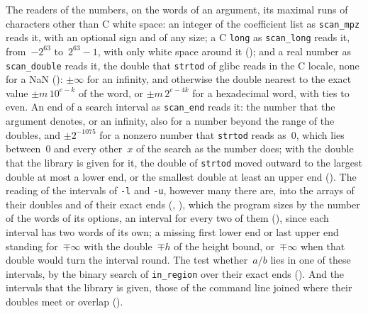 \begin{definition}\label{def:cliNumbers}
  \leanok
  The readers of the numbers, on the words of an argument, its maximal runs of characters other
  than C white space: an integer of the coefficient list as \verb|scan_mpz| reads it, with an
  optional sign and of any size; a C \verb|long| as \verb|scan_long| reads it, from~$-2^{63}$
  to~$2^{63} - 1$, with only white space around it (); and a real number
  as \verb|scan_double| reads it, the double that \verb|strtod| of glibc reads in the C locale, none
  for a NaN (): $\pm\infty$ for an infinity, and otherwise the double
  nearest to the exact value $\pm m\,10^{e - k}$ of the word, or $\pm m\,2^{e - 4k}$ for a
  hexadecimal word, with ties to even. An end of a search interval as \verb|scan_end| reads it: the
  number that the argument denotes, or an infinity, also for a number beyond the range of the
  doubles, and $\pm 2^{-1075}$ for a nonzero number that \verb|strtod| reads as~$0$, which lies
  between~$0$ and every other~$x$ of the search as the number does; with the double that the
  library is given for it, the double of \verb|strtod| moved outward to the largest double at most
  a lower end, or the smallest double at least an upper end (). The
  reading of the intervals of \verb|-l| and \verb|-u|, however many there are, into the arrays of
  their doubles and of their exact ends (, ), which
  the program sizes by the number of the words of its options, an interval for every two of them
  (), since each interval has two words of its own; a missing
  first lower end or last upper end standing for~$\mp\infty$ with the double~$\mp h$ of the height
  bound, or~$\mp\infty$ when that double would turn the interval round. The test whether~$a/b$ lies
  in one of these intervals, by the binary search of \verb|in_region| over their exact ends
  (). And the intervals that the library is given, those of the command
  line joined where their doubles meet or overlap ().
\end{definition}

